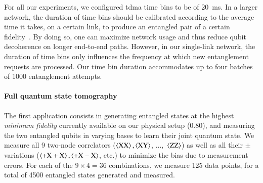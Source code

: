 For all our experiments, we configured \acrshort{tdma} time bins to be of \qty{20}{\ms}. In a larger
network, the duration of time bins should be calibrated according to the average time it takes, on a
certain link, to produce an entangled pair of a certain fidelity~\cite{skrzypczyk_2021_arch}. By
doing so, one can maximize network usage and thus reduce qubit decoherence on longer end-to-end
paths. However, in our single-link network, the duration of time bins only influences the frequency
at which new entanglement requests are processed. Our time bin duration accommodates up to four
batches of \num{1000} entanglement attempts.


\paragraph{Full quantum state tomography}

The first application consists in generating entangled states at the highest \emph{minimum fidelity}
currently available on our physical setup (\num{0.80}), and measuring the two entangled qubits in
varying bases to learn their joint quantum state. We measure all \num{9} two-node correlators
($\braket{\mathrm{XX}}, \braket{\mathrm{XY}}$, ...,~$\braket{\mathrm{ZZ}}$) as well as all their
$\pm$ variations ($\braket{\mathrm{+X+X}}, \braket{\mathrm{+X-X}}$, etc.) to minimize the bias due
to measurement errors. For each of the $9 \times 4 = 36$ combinations, we measure \num{125} data
points, for a total of \num{4500} entangled states generated and measured.

